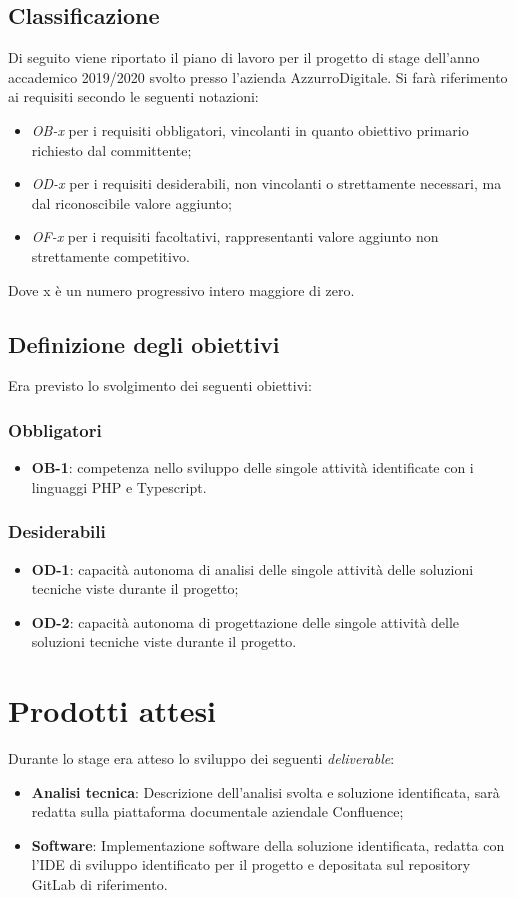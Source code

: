 \subsection{Classificazione}
Di seguito viene riportato il piano di lavoro per il progetto di stage dell'anno accademico 2019/2020 svolto presso l'azienda AzzurroDigitale.
Si farà riferimento ai requisiti secondo le seguenti notazioni:
\begin{itemize}
	\item \textit{OB-x} per i requisiti obbligatori, vincolanti in quanto obiettivo primario richiesto dal committente;
	\item \textit{OD-x} per i requisiti desiderabili, non vincolanti o strettamente necessari,
	ma dal riconoscibile valore aggiunto;
	\item \textit{OF-x} per i requisiti facoltativi, rappresentanti valore aggiunto non strettamente competitivo.
\end{itemize}
Dove x è un numero progressivo intero maggiore di zero.

\subsection{Definizione degli obiettivi}
Era previsto lo svolgimento dei seguenti obiettivi:
\subsubsection*{Obbligatori}
\begin{itemize}
 \item \textbf{OB-1}: competenza nello sviluppo delle singole attività identificate con i linguaggi PHP e Typescript.
\end{itemize}
\subsubsection*{Desiderabili} 
\begin{itemize}
 \item \textbf{OD-1}: capacità autonoma di analisi delle singole attività delle soluzioni tecniche viste durante il progetto;
\item \textbf{OD-2}: capacità autonoma di progettazione delle singole attività delle soluzioni tecniche viste durante il progetto.
\end{itemize}

\section{Prodotti attesi}
Durante lo stage era atteso lo sviluppo dei seguenti \emph{deliverable}:
\begin{itemize}
	\item \textbf{Analisi tecnica}: Descrizione dell’analisi svolta e soluzione identificata, sarà redatta sulla piattaforma documentale aziendale Confluence;
	\item \textbf{Software}: Implementazione software della soluzione identificata, redatta con l’IDE di sviluppo identificato per il progetto e depositata sul repository GitLab di riferimento.
\end{itemize}


